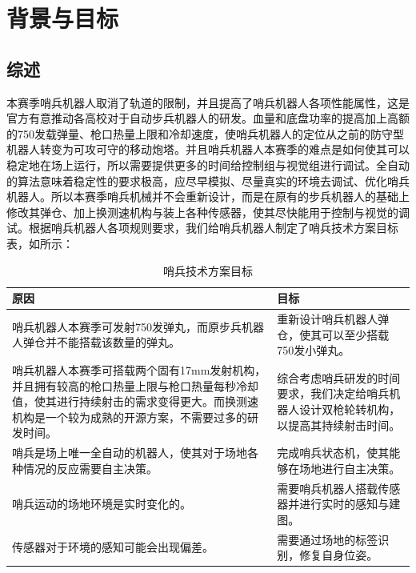 \chapter{背景与目标}


\section{综述}

本赛季哨兵机器人取消了轨道的限制，并且提高了哨兵机器人各项性能属性，这是官方有意推动各高校对于自动步兵机器人的研发。血量和底盘功率的提高加上高额的750发载弹量、枪口热量上限和冷却速度，使哨兵机器人的定位从之前的防守型机器人转变为可攻可守的移动炮塔。并且哨兵机器人本赛季的难点是如何使其可以稳定地在场上运行，所以需要提供更多的时间给控制组与视觉组进行调试。全自动的算法意味着稳定性的要求极高，应尽早模拟、尽量真实的环境去调试、优化哨兵机器人。所以本赛季哨兵机械并不会重新设计，而是在原有的步兵机器人的基础上修改其弹仓、加上换测速机构与装上各种传感器，使其尽快能用于控制与视觉的调试。根据哨兵机器人各项规则要求，我们给哨兵机器人制定了哨兵技术方案目标表，如所示：

\begin{table}[hbtp!]
    \renewcommand\arraystretch{1.5}
    \centering
    \begin{tabular}{ p{8cm}<{\centering\arraybackslash}  p{8cm}<{\centering\arraybackslash} }
    \toprule
      原因  &  目标 \\
        \midrule
        哨兵机器人本赛季可发射750发弹丸，而原步兵机器人弹仓并不能搭载该数量的弹丸。 & 重新设计哨兵机器人弹仓，使其可以至少搭载750发小弹丸。 \\   
         \midrule
         哨兵机器人本赛季可搭载两个固有17mm发射机构，并且拥有较高的枪口热量上限与枪口热量每秒冷却值，使其进行持续射击的需求变得更大。而换测速机构是一个较为成熟的开源方案，不需要过多的研发时间。 & 综合考虑哨兵研发的时间要求，我们决定给哨兵机器人设计双枪轮转机构，以提高其持续射击时间。 \\
         \midrule
         哨兵是场上唯一全自动的机器人，使其对于场地各种情况的反应需要自主决策。 &  完成哨兵状态机，使其能够在场地进行自主决策。 \\
         \midrule
         哨兵运动的场地环境是实时变化的。 &  需要哨兵机器人搭载传感器并进行实时的感知与建图。 \\
         \midrule
         传感器对于环境的感知可能会出现偏差。 &  需要通过场地的标签识别，修复自身位姿。 \\
    \toprule
    \end{tabular}
    \caption{哨兵技术方案目标}
    \label{tab:哨兵技术方案目标}
\end{table}


